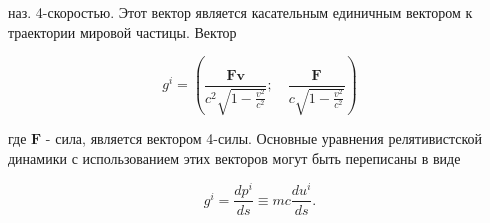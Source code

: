 \documentclass[10pt]{article}
\begin{document}
наз. 4-скоростью. Этот вектор является касательным единичным вектором к траектории мировой частицы. Вектор



\[

g^{i}=\left(\frac{\boldsymbol{F v}}{c^{2} \sqrt{1-\frac{v^{2}}{c^{2}}}} ; \quad \frac{\boldsymbol{F}}{c \sqrt{1-\frac{v^{2}}{c^{2}}}}\right)

\]



где $\boldsymbol{F}$ - сила, является вектором 4-силы. Основные уравнения релятивистской динамики с использованием этих векторов могут быть переписаны в виде



\[

g^{i}=\frac{d p^{i}}{d s} \equiv m c \frac{d u^{i}}{d s} .

\]
\end{document}
